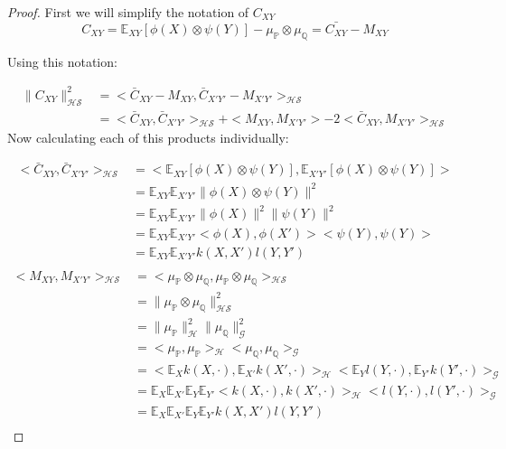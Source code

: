 \documentclass[8pt,a4paper]{article}
\theoremstyle{plain}
\theoremstyle{definition}
\theoremstyle{remark}
\providecommand{\norm}[1]{\lVert#1\rVert}
\begin{document}
\begin{proof}


First we will simplify the notation of $C_{XY}$
$$ C_{XY} = \mathbb{E}_{XY}[\phi(X) \otimes \psi(Y)] - \mu_{\mathbb{P}} \otimes \mu_{\mathbb{Q}} = \bar{C_{XY}} - M_{XY}$$

Using this notation:

\begin{equation}
\begin{split}
\norm{C_{XY}}^{2}_{\mathcal{HS}}
& = <\bar{C}_{XY} - M_{XY},\bar{C}_{X'Y'} - M_{X'Y'}>_{\mathcal{HS}} \\
& = <\bar{C}_{XY},\bar{C}_{X'Y'}>_{\mathcal{HS}}+< M_{XY}, M_{X'Y'}>-2<\bar{C}_{XY}, M_{X'Y'}>_{\mathcal{HS}}
\end{split}
\end{equation}
Now calculating each of this products individually:

\begin{equation}
\begin{split}
<\bar{C}_{XY},\bar{C}_{X'Y'}>_{\mathcal{HS}} 
& = <\mathbb{E}_{XY}[\phi(X) \otimes \psi(Y)],\mathbb{E}_{X'Y'}[\phi(X) \otimes \psi(Y)] >\\
& = \mathbb{E}_{XY}\mathbb{E}_{X'Y'}\norm{\phi(X) \otimes \psi(Y)}^{2} \\
& = \mathbb{E}_{XY}\mathbb{E}_{X'Y'}\norm{\phi(X)}^{2}\norm{\psi(Y)}^{2}\\
& = \mathbb{E}_{XY}\mathbb{E}_{X'Y'}<\phi(X),\phi(X')><\psi(Y),\psi(Y)> \\
& = \mathbb{E}_{XY}\mathbb{E}_{X'Y'} k(X,X')l(Y,Y') \\
\end{split}
\end{equation}
\begin{equation}
\begin{split}
<M_{XY},M_{X'Y'}>_{\mathcal{HS}}
& = <\mu_{\mathbb{P}}\otimes\mu_{\mathbb{Q}},\mu_{\mathbb{P}}\otimes\mu_{\mathbb{Q}}>_{\mathcal{HS}} \\
& = \norm{\mu_{\mathbb{P}}\otimes\mu_{\mathbb{Q}}}^{2}_{\mathcal{HS}} \\
& = \norm{\mu_{\mathbb{P}}}^{2}_{\mathcal{H}}\norm{\mu_{\mathbb{Q}}}^{2}_{\mathcal{G}} \\
& = <\mu_{\mathbb{P}},\mu_{\mathbb{P}}>_{\mathcal{H}}<\mu_{\mathbb{Q}},\mu_{\mathbb{Q}}>_{\mathcal{G}} \\
& = <\mathbb{E}_{X}k(X,\cdot),\mathbb{E}_{X'}k(X',\cdot)>_{\mathcal{H}}<\mathbb{E}_{Y}l(Y,\cdot),\mathbb{E}_{Y'}k(Y',\cdot)>_{\mathcal{G}} \\
& = \mathbb{E}_{X}\mathbb{E}_{X'}\mathbb{E}_{Y}\mathbb{E}_{Y'}<k(X,\cdot),k(X',\cdot)>_{\mathcal{H}}<l(Y,\cdot),l(Y',\cdot)>_{\mathcal{G}} \\
& = \mathbb{E}_{X}\mathbb{E}_{X'}\mathbb{E}_{Y}\mathbb{E}_{Y'}k(X,X')l(Y,Y') \\
\end{split}
\end{equation}


\end{proof}
\end{document}
